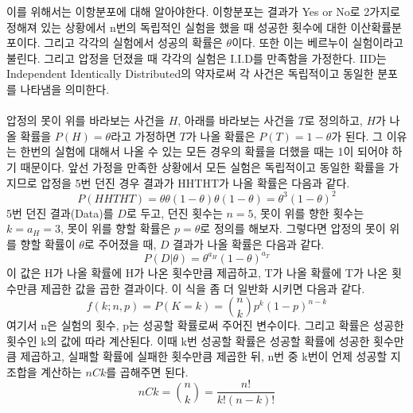 \documentclass[a4paper]{oblivoir}
\begin{document}
\indent 이를 위해서는 이항분포에 대해 알아야한다. 이항분포는 결과가 Yes or No로 2가지로 정해져 있는 상황에서 n번의 독립적인 실험을 했을 때 성공한 횟수에 대한 이산확률분포이다. 그리고 각각의 실험에서 성공의 확률은 $\theta$이다. 또한 이는 베르누이 실험이라고 불린다. 그리고 압정을 던졌을 때 각각의 실험은 I.I.D를 만족함을 가정한다. IID는 Independent Identically Distributed의 약자로써 각 사건은 독립적이고 동일한 분포를 나타냄을 의미한다.\\\\
\indent 압정의 못이 위를 바라보는 사건을 $H$, 아래를 바라보는 사건을 $T$로 정의하고, $H$가 나올 확률을 $P(H)=\theta$라고 가정하면 $T$가 나올 확률은 $P(T)=1-\theta$가 된다. 그 이유는 한번의 실험에 대해서 나올 수 있는 모든 경우의 확률을 더했을 때는 1이 되어야 하기 때문이다. 앞선 가정을 만족한 상황에서 모든 실험은 독립적이고 동일한 확률을 가지므로 압정을 5번 던진 경우 결과가 HHTHT가 나올 확률은 다음과 같다.\\
\begin{equation}
P(HHTHT)=\theta\theta(1-\theta)\theta(1-\theta)=\theta^3(1-\theta)^2
\label{eq:1-1}
\end{equation}
 5번 던진 결과(Data)를 $D$로 두고, 던진 횟수는 $n=5$, 못이 위를 향한 횟수는 $k=a_H=3$, 못이 위를 향할 확률은 $p=\theta$로 정의를 해보자. 그렇다면 압정의 못이 위를 향할 확률이 $\theta$로 주어졌을 때, $D$ 결과가 나올 확률은 다음과 같다.\\
\begin{equation}
P(D| \theta)=\theta^{a_H}(1-\theta)^{a_T}
\label{eq:1-2}
\end{equation}
\indent 이 값은 H가 나올 확률에 H가 나온 횟수만큼 제곱하고, T가 나올 확률에 T가 나온 횟수만큼 제곱한 값을 곱한 결과이다. 이 식을 좀 더 일반화 시키면 다음과 같다.\\
\begin{equation}
f(k;n,p)=P(K=k)={\binom{n}{k}}p^k(1-p)^{n-k}
\label{eq:1-3}
\end{equation}
\indent 여기서 n은 실험의 횟수, p는 성공할 확률로써 주어진 변수이다. 그리고 확률은 성공한 횟수인 k의 값에 따라 계산된다. 이때 k번 성공할 확률은 성공할 확률에 성공한 횟수만큼 제곱하고, 실패할 확률에 실패한 횟수만큼 제곱한 뒤, n번 중 k번이 언제 성공할 지 조합을 계산하는 $nCk$를 곱해주면 된다.\\
\begin{equation}
nCk={\binom{n}{k}}=\frac{n!}{k!(n-k)!}
\label{eq:1-4}
\end{equation}\\
\end{document}
